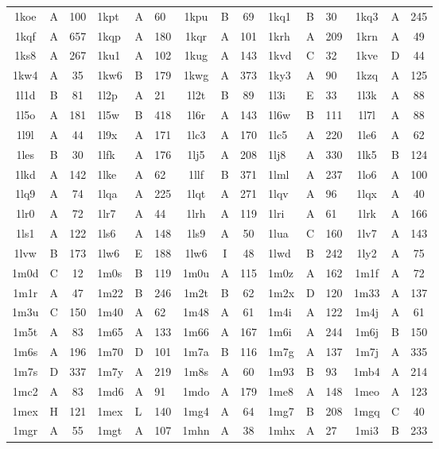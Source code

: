 \begin{longtable}{|c|c|c| a|a|a| c|c|c| a|a|a| c|c|c|}
1koe & A & 100 & 1kpt & A & 60 & 1kpu & B & 69 & 1kq1 & B & 30 & 1kq3 & A & 245\\
1kqf & A & 657 & 1kqp & A & 180 & 1kqr & A & 101 & 1krh & A & 209 & 1krn & A & 49\\
1ks8 & A & 267 & 1ku1 & A & 102 & 1kug & A & 143 & 1kvd & C & 32 & 1kve & D & 44\\
1kw4 & A & 35 & 1kw6 & B & 179 & 1kwg & A & 373 & 1ky3 & A & 90 & 1kzq & A & 125\\
1l1d & B & 81 & 1l2p & A & 21 & 1l2t & B & 89 & 1l3i & E & 33 & 1l3k & A & 88\\
1l5o & A & 181 & 1l5w & B & 418 & 1l6r & A & 143 & 1l6w & B & 111 & 1l7l & A & 88\\
1l9l & A & 44 & 1l9x & A & 171 & 1lc3 & A & 170 & 1lc5 & A & 220 & 1le6 & A & 62\\
1les & B & 30 & 1lfk & A & 176 & 1lj5 & A & 208 & 1lj8 & A & 330 & 1lk5 & B & 124\\
1lkd & A & 142 & 1lke & A & 62 & 1llf & B & 371 & 1lml & A & 237 & 1lo6 & A & 100\\
1lq9 & A & 74 & 1lqa & A & 225 & 1lqt & A & 271 & 1lqv & A & 96 & 1lqx & A & 40\\
1lr0 & A & 72 & 1lr7 & A & 44 & 1lrh & A & 119 & 1lri & A & 61 & 1lrk & A & 166\\
1ls1 & A & 122 & 1ls6 & A & 148 & 1ls9 & A & 50 & 1lua & C & 160 & 1lv7 & A & 143\\
1lvw & B & 173 & 1lw6 & E & 188 & 1lw6 & I & 48 & 1lwd & B & 242 & 1ly2 & A & 75\\
1m0d & C & 12 & 1m0s & B & 119 & 1m0u & A & 115 & 1m0z & A & 162 & 1m1f & A & 72\\
1m1r & A & 47 & 1m22 & B & 246 & 1m2t & B & 62 & 1m2x & D & 120 & 1m33 & A & 137\\
1m3u & C & 150 & 1m40 & A & 62 & 1m48 & A & 61 & 1m4i & A & 122 & 1m4j & A & 61\\
1m5t & A & 83 & 1m65 & A & 133 & 1m66 & A & 167 & 1m6i & A & 244 & 1m6j & B & 150\\
1m6s & A & 196 & 1m70 & D & 101 & 1m7a & B & 116 & 1m7g & A & 137 & 1m7j & A & 335\\
1m7s & D & 337 & 1m7y & A & 219 & 1m8s & A & 60 & 1m93 & B & 93 & 1mb4 & A & 214\\
1mc2 & A & 83 & 1md6 & A & 91 & 1mdo & A & 179 & 1me8 & A & 148 & 1meo & A & 123\\
1mex & H & 121 & 1mex & L & 140 & 1mg4 & A & 64 & 1mg7 & B & 208 & 1mgq & C & 40\\
1mgr & A & 55 & 1mgt & A & 107 & 1mhn & A & 38 & 1mhx & A & 27 & 1mi3 & B & 233\\

\end{longtable}

